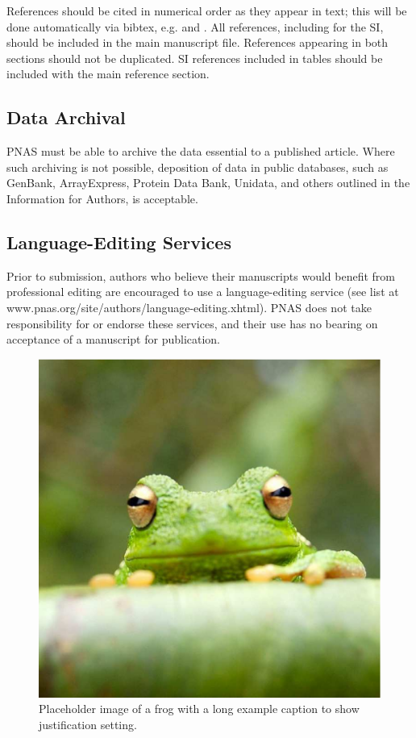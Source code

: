 \documentclass[9pt,twocolumn,twoside]{pnas-new}
\begin{document}
References should be cited in numerical order as they appear in text; this will be done automatically via bibtex, e.g. \cite{belkin2002using} and \cite{berard1994embedding,coifman2005geometric}. All references, including for the SI, should be included in the main manuscript file. References appearing in both sections should not be duplicated.  SI references included in tables should be included with the main reference section. 

\subsection*{Data Archival}

PNAS must be able to archive the data essential to a published article. Where such archiving is not possible, deposition of data in public databases, such as GenBank, ArrayExpress, Protein Data Bank, Unidata, and others outlined in the Information for Authors, is acceptable.

\subsection*{Language-Editing Services}
Prior to submission, authors who believe their manuscripts would benefit from professional editing are encouraged to use a language-editing service (see list at www.pnas.org/site/authors/language-editing.xhtml). PNAS does not take responsibility for or endorse these services, and their use has no bearing on acceptance of a manuscript for publication. 

\begin{figure}%
\centering
\includegraphics[width=.8\linewidth]{figures/frog}
\caption{Placeholder image of a frog with a long example caption to show justification setting.}
\label{fig:frog}
\end{figure}
\end{document}
